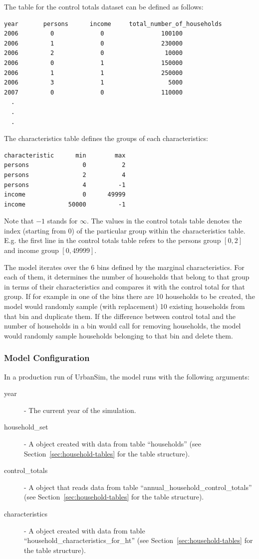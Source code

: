 The table for the control totals dataset can be
defined as follows:
\begin{verbatim}
year       persons      income     total_number_of_households
2006         0             0                100100
2006         1             0                230000
2006         2             0                 10000
2006         0             1                150000
2006         1             1                250000
2006         3             1                  5000
2007         0             0                110000
  .
  .
  .
\end{verbatim}
The characteristics table defines the groups of each characteristics:
\begin{verbatim}
characteristic      min        max
persons               0          2
persons               2          4
persons               4         -1
income                0      49999
income            50000         -1
\end{verbatim}
Note that $-1$ stands for $\infty$. The values in the control totals table
denotes the index (starting from 0) of the particular group within the
characteristics table. E.g. the first line in the control totals table refers
to the persons group $[0,2]$ and income group $[0,49999]$.

The model iterates over the 6 bins defined by the marginal characteristics. 
For each of them, it determines the number of households
that belong to that group in terms of their characteristics and compares it
with the control total for that group. If for example in one of the bins 
there are 10 households to be created, the model would randomly
sample (with replacement) 10 existing households from that bin and duplicate them.  
If the difference between control total
and the number of households in a bin would call for removing households, the
model would randomly sample households belonging to that bin and delete them.

\subsubsection{Model Configuration}
%
In a production run of UrbanSim, the model runs with the following arguments:
\begin{description}
\item[year] - The current year of the simulation.
\item[household_set] - A  object created with data from
  table ``households'' (see Section~\ref{sec:household-tables}
  for the table structure).
\item[control_totals] - A  object  that reads data from table
  ``annual_household_control_totals'' (see Section~\ref{sec:household-tables}
  for the table structure).
\item[characteristics] - A  object created
  with data from table ``household_characteristics_for_ht'' (see
  Section~\ref{sec:household-tables} for the table structure).
\end{description}

